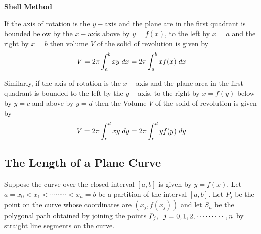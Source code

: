 \documentclass[11pt,a4paper]{article}
\theoremstyle{definition}
\newcommand{\subhead}[1]{%
  \par\medskip\noindent\textbf{#1}\par\nobreak\smallskip}
\begin{document}
\subhead{Shell Method}


If the axis of rotation is the $y-$axis and the plane are in the first quadrant is bounded below by  the $x-$axis above by $y = f(x)$, to the left by $x = a$ and the right by $x = b$ then volume $V$ of the solid of revolution is given by 
$$V = 2\pi \int^b_a xy\hspace{0.1cm}  dx = 2\pi \int^b_a xf(x) \hspace{0.1cm} dx$$


\begin{figure}[H]
\centering
{}
\end{figure}

Similarly, if the axis of rotation is the $x-$axis and the plane area in the first quadrant is bounded to the left by the $y-$axis, to the right by $x = f(y)$ below by $y = c$ and above by $y = d$ then  the Volume $V$ of the solid of revolution is given by 
$$V = 2\pi \int^d_c xy\hspace{0.1cm}  dy = 2\pi \int^d_c yf(y) \hspace{0.1cm} dy$$


\begin{figure}[H]
\centering
{}
\end{figure}

\subsection{The Length of a Plane Curve}
Suppose the curve over the closed interval $[a,b]$ is given by $y = f(x)$. Let\\ $a = x_0 < x_1 < \cdots\cdots\cdots < x_n = b$ be a partition of the interval $[a,b]$. Let $P_j$ be the point on the curve whose coordinates are $(x_j , f(x_j))$ and let $S_n$ be the polygonal path obtained by joining the points $P_j, \hspace{0.2cm} j = 0, 1, 2,\cdots\cdots\cdots, n$ by straight line segments on the curve.
\end{document}
